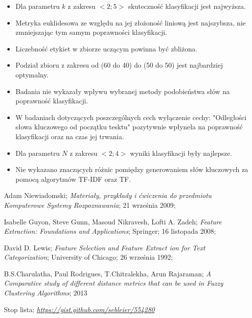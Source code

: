 \documentclass{classrep}
\begin{document}
\begin{itemize}
    \item Dla parametru $k$ z zakresu $<2;5>$ skuteczność klasyfikacji jest najwyższa.
    \item Metryka euklidesowa ze względu na jej złożoność liniową jest najszybsza, nie zmniejszając
            tym samym poprawności klasyfikacji.
    \item Liczebność etykiet w zbiorze uczącym powinna być zbliżona.
    \item Podział zbioru z zakresu od (60 do 40) do (50 do 50) jest najbardziej optymalny.
    \item Badania nie wykazały wpływu wybranej metody podobieństwa słów na poprawność klasyfikacji.
    \item W badaniach dotyczących poszczególnych cech wyłączenie cechy: "Odległości słowa kluczowego
        od początku tesktu" pozytywnie wpłyneła na poprawność klasyfikacji oraz na czas jej trwania.
    \item Dla parametru $N$ z zakresu $<2;4>$ wyniki klasyfikacji były najlepsze.
    \item Nie wykazano znaczących różnic pomiędzy generowaniem słów kluczowych za pomocą algorytmów TF-IDF oraz TF.
\end{itemize}


\begin{thebibliography}{0}

 Adam Niewiadomski;
\textsl{Materiały, przykłady i ćwiczenia do przedmiotu
Komputerowe Systemy Rozpoznawania}; 21 września 2009;

 Isabelle Guyon, Steve Gunn, Masoud Nikravesh, Lofti A. Zadeh;
\textsl{Feature Extraction: Foundations and Applications}; Springer; 16 listopada 2008;

 David D. Lewis;
\textsl{Feature Selection and Feature Extract ion for Text Categorization}; University of Chicago; 26 września 1992;

 B.S.Charulatha, Paul Rodrigues, T.Chitralekha, Arun Rajaraman;
\textsl{A Comparative study of different distance metrics that can be used in Fuzzy Clustering Algorithms}; 2013

 Stop lista;
\textsl{\url{https://gist.github.com/sebleier/554280}}

\end{thebibliography}
\end{document}

